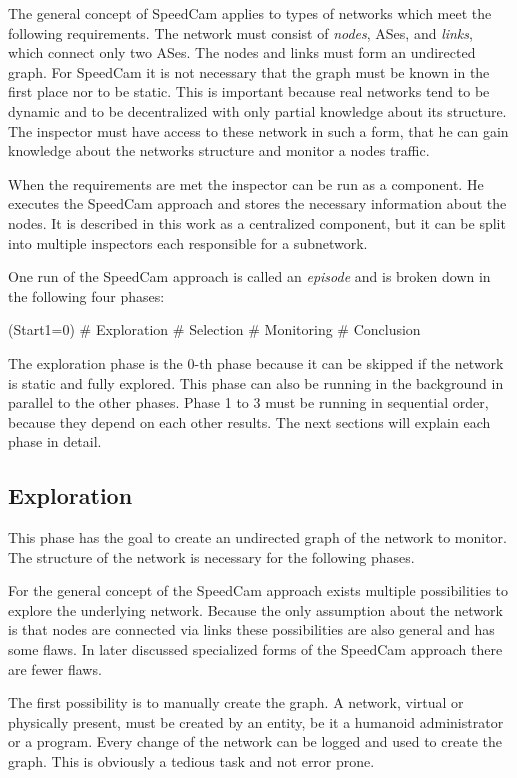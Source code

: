 \documentclass[thesis.tex]{subfiles}
\begin{document}
The general concept of SpeedCam applies to types of networks which meet the following requirements. The network must consist of \textit{nodes}, ASes, and \textit{links}, which connect only two ASes. The nodes and links must form an undirected graph. For SpeedCam it is not necessary that the graph must be known in the first place nor to be static. This is important because real networks tend to be dynamic and to be decentralized with only partial knowledge about its structure. The inspector must have access to these network in such a form, that he can gain knowledge about the networks structure and monitor a nodes traffic.

When the requirements are met the inspector can be run as a component. He executes the SpeedCam approach and stores the necessary information about the nodes. It is described in this work as a centralized component, but it can be split into multiple inspectors each responsible for a subnetwork. 

One run of the SpeedCam approach is called an \textit{episode} and is broken down in the following four phases:
\begin{easylist}
    \MyNumberedListProperties
    \ListProperties(Start1=0)
    # Exploration
    # Selection
    # Monitoring
    # Conclusion
\end{easylist}

The exploration phase is the 0-th phase because it can be skipped if the network is static and fully explored. This phase can also be running in the background in parallel to the other phases. Phase 1 to 3 must be running in sequential order, because they depend on each other results. The next sections will explain each phase in detail.

\subsection{Exploration}
This phase has the goal to create an undirected graph of the network to monitor. The structure of the network is necessary for the following phases. 

For the general concept of the SpeedCam approach exists multiple possibilities to explore the underlying network. Because the only assumption about the network is that nodes are connected via links these possibilities are also general and has some flaws. In later discussed specialized forms of the SpeedCam approach there are fewer flaws.

The first possibility is to manually create the graph. A network, virtual or physically present, must be created by an entity, be it a humanoid administrator or a program. Every change of the network can be logged and used to create the graph. This is obviously a tedious task and not error prone. 
\end{document}
